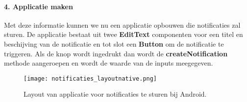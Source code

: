 \paragraph{4. Applicatie maken}
Met deze informatie kunnen we nu een applicatie opbouwen die notificaties zal sturen. De applicatie bestaat 
uit twee \textbf{EditText} componenten voor een titel en beschijving van de notificatie en tot slot een 
\textbf{Button} om de notificatie te triggeren. Als de knop wordt ingedrukt dan wordt de 
\textbf{createNotification} methode aangeroepen en wordt de waarde van de inputs meegegeven. %
\begin{figure}[H]
  \centering
  \texttt{[image: notificaties\_layoutnative.png]}
  \caption{Layout van applicatie voor notificaties te sturen bij Android.}
\end{figure}